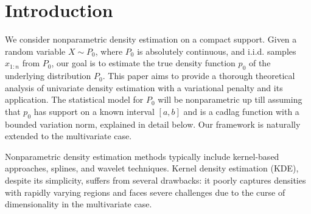 \section{Introduction}
\label{intro}
We consider nonparametric density estimation on a compact support. Given a random variable $X \sim P_0$, where $P_0$ is absolutely continuous, and i.i.d. samples $x_{1:n}$ from $P_0$, our goal is to estimate the true density function $p_0$ of the underlying distribution $P_0$. This paper aims to provide a thorough theoretical analysis of univariate density estimation with a variational penalty and its application. The statistical model for $P_0$ will be nonparametric up till assuming that $p_0$ has support on a known interval $[a,b]$ and is a cadlag function with a bounded variation norm, explained in detail below. Our framework is naturally extended to the multivariate case. 

Nonparametric density estimation methods typically include kernel-based approaches, splines, and wavelet techniques. Kernel density estimation (KDE), despite its simplicity, suffers from several drawbacks: it poorly captures densities with rapidly varying regions and faces severe challenges due to the curse of dimensionality in the multivariate case.

